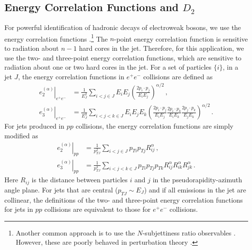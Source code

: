 \documentclass[a4paper,11pt]{article}
\newcommand{\ecf}[2]{e_{#1}^{(#2)}}
\begin{document}
\subsection{Energy Correlation Functions and $D_2$}\label{sec:D2def}

For powerful identification of hadronic decays of electroweak bosons, we use the energy correlation functions \cite{Larkoski:2013eya}.\footnote{Another common approach is to use the $N$-subjettiness ratio observables \cite{Thaler:2010tr,Thaler:2011gf}. However, these are poorly behaved in perturbation theory \cite{Larkoski:2015uaa}.}  The $n$-point energy correlation function is sensitive to radiation about $n-1$ hard cores in the jet.  Therefore, for this application, we use the two- and three-point energy correlation functions, which are sensitive to radiation about one or two hard cores in the jet.  For a set of particles $\{i\}$, in a jet $J$, the energy correlation functions in $e^+e^-$ collisions are defined as
\begin{align}\label{eq:eee2}
\left.\ecf{2}{\alpha}\right|_{e^+e^-}&=\frac{1}{E_J^2}\sum_{i<j\in J} E_i E_j\left(
\frac{2p_i\cdot p_j}{E_i E_j}
\right)^{\alpha/2}\,, \\
\left.\ecf{3}{\alpha}\right|_{e^+e^-}&=\frac{1}{E_J^3}\sum_{i<j<k\in J} E_i E_j E_k\left(
\frac{2p_i\cdot p_j}{E_i E_j}\frac{2p_i\cdot p_k}{E_i E_k}\frac{2p_j\cdot p_k}{E_j E_k}
\right)^{\alpha/2}\,.
\end{align}
For jets produced in $pp$ collisions, the energy correlation functions are simply modified as
\begin{align}\label{eq:ppe2}
\left.\ecf{2}{\alpha}\right|_{pp}&=\frac{1}{p_{TJ}^2}\sum_{i<j\in J} p_{Ti} p_{Tj}R_{ij}^\alpha\,, \\
\left.\ecf{3}{\alpha}\right|_{pp}&=\frac{1}{p_{TJ}^3}\sum_{i<j<k\in J} p_{Ti} p_{Tj}p_{Tk}R_{ij}^\alpha R_{ik}^\alpha R_{jk}^\alpha\,.
\end{align}
Here $R_{ij}$ is the distance between particles $i$ and $j$ in the pseudorapidity-azimuth angle plane.  For jets that are central ($p_{TJ} \sim E_J$) and if all emissions in the jet are collinear, the definitions of the two- and three-point energy correlation functions for jets in $pp$ collisions are equivalent to those for $e^+e^-$ collisions.
\end{document}
